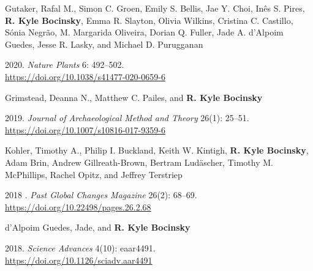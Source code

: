 Gutaker, Rafal M., Simon C. Groen, Emily S. Bellis, Jae Y. Choi, Inês S. Pires, {\bf R. Kyle Bocinsky}, Emma R. Slayton, Olivia Wilkins, Cristina C. Castillo, Sónia Negrão, M. Margarida Oliveira, Dorian Q. Fuller, Jade A. d’Alpoim Guedes, Jesse R. Lasky, and Michael D. Purugganan
\begin{list1}
\item[] 2020\hspace{.2cm}{Genomic history and ecology of the geographic spread of rice}. \emph{Nature Plants} 6: 492–502.\\\href{https://doi.org/10.1038/s41477-020-0659-6}{https://doi.org/10.1038/s41477-020-0659-6}
\end{list1}


Grimstead, Deanna N., Matthew C. Pailes, and {\bf R. Kyle Bocinsky} 
\begin{list1}
\item[] 2019\hspace{.2cm}{Refining potential source regions via combined maize niche modeling and isotopes: A case study from Chaco Canyon, NM, USA}. \emph{Journal of Archaeological Method and Theory} 26(1): 25–51.\\\href{https://doi.org/10.1007/s10816-017-9359-6}{https://doi.org/10.1007/s10816-017-9359-6}
\end{list1}


Kohler, Timothy A., Philip I. Buckland, Keith W. Kintigh, {\bf R. Kyle Bocinsky}, Adam Brin, Andrew Gillreath-Brown, Bertram Lud{\"a}scher, Timothy M. McPhillips, Rachel Opitz, and Jeffrey Terstriep
\begin{list1}
\item[] 2018 \hspace{.2cm}{Paleodata for and from archaeology}. \emph{Past Global Changes Magazine} 26(2): 68–69.\\\href{https://doi.org/10.22498/pages.26.2.68}{https://doi.org/10.22498/pages.26.2.68}
\end{list1}


d'Alpoim Guedes, Jade, and {\bf R. Kyle Bocinsky} 
\begin{list1}
\item[] 2018\hspace{.2cm}{Climate change stimulated agricultural innovation and exchange across Asia}. \emph{Science Advances} 4(10): eaar4491.\\\href{https://doi.org/10.1126/sciadv.aar4491}{https://doi.org/10.1126/sciadv.aar4491}
\end{list1}


